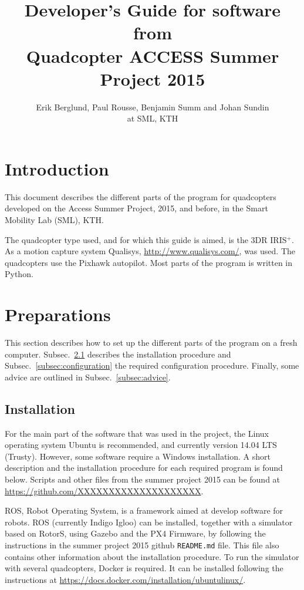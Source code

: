 \documentclass[titlepage,11pt,a4paper]{article}
\title{Developer's Guide for software from \\Quadcopter ACCESS Summer Project 2015}
\author{Erik Berglund, Paul Rousse, Benjamin
  Summ and Johan Sundin \\at SML, KTH}
\begin{document}
\maketitle \tableofcontents
\newpage

\section{Introduction}
This document describes the different parts of the program for
quadcopters developed on the Access Summer Project, 2015, and before,
in the Smart Mobility Lab (SML), KTH.

The quadcopter type used, and for which this guide is aimed, is the
3DR IRIS$^+$. As a motion capture system Qualisys,
\url{http://www.qualisys.com/}, was used. The quadcopters use the
Pixhawk autopilot. Most parts of the program is written in Python.


\section{Preparations}
This section describes how to set up the different parts of the
program on a fresh computer. Subsec.~\ref{subsec:installation}
describes the installation procedure and
Subsec.~\ref{subsec:configuration} the required configuration
procedure. Finally, some advice are outlined in
Subsec.~\ref{subsec:advice}.

\subsection{Installation}
\label{subsec:installation}
For the main part of the software that was used in the project, the
Linux operating system Ubuntu is recommended, and currently version
14.04 LTS (Trusty). However, some software require a Windows
installation. A short description and the installation procedure for
each required program is found below. Scripts and other files from the
summer project 2015 can be found at
\url{https://github.com/XXXXXXXXXXXXXXXXXXXX}.

ROS, Robot Operating System, is a framework aimed at develop software
for robots. ROS (currently Indigo Igloo) can be installed, together
with a simulator based on RotorS, using Gazebo and the PX4 Firmware,
by following the instructions in the summer project 2015 github
\texttt{README.md} file. This file also contains other information
about the installation procedure. To run the simulator with several
quadcopters, Docker is required. It can be installed following the
instructions at
\url{https://docs.docker.com/installation/ubuntulinux/}.
\end{document}
